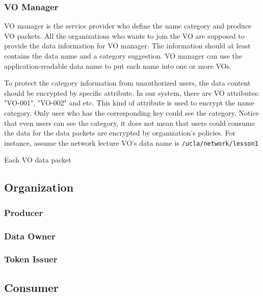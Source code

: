 \subsubsection{VO Manager}
VO manager is the service provider who define the name category and produce VO packets.
All the organizations who wants to join the VO are supposed to provide the data information for VO manager.
The information should at least contains the data name and a category suggestion.
VO manager can use the application-readable data name to put each name into one or more VOs.

To protect the category information from unauthorized users, the data content should be encrypted by specific attribute.
In our system, there are VO attributes: "VO-001", "VO-002" and etc.
This kind of attribute is used to encrypt the name category.
Only user who has the corresponding key could see the category.
Notice that even users can see the category, it does not mean that users could consume the data for the data packets are encrypted by organization's policies.
For instance, assume the network lecture VO's data name is \texttt{/ucla/network/lesson1}

Each VO data packet

\subsection{Organization}

\subsubsection{Producer}

\subsubsection{Data Owner}

\subsubsection{Token Issuer} \label{token-issuer}


\subsection{Consumer}